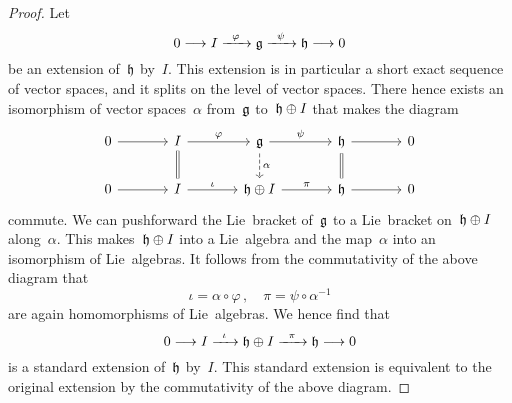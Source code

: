 \begin{proof}
  Let
  \[
    0
    \to
    I
    \xto{\varphi}
    \glie
    \xto{\psi}
    \hlie
    \to
    0
  \]
  be an extension of~$\mathfrak{h}$ by~$I$.
  This extension is in particular a short exact sequence of vector spaces, and it splits on the level of vector spaces.
  There hence exists an isomorphism of vector spaces~$\alpha$ from~$\mathfrak{g}$ to~$\mathfrak{h} \oplus I$ that makes the diagram
  \[
    \begin{tikzcd}[column sep = large]
      0
      \arrow{r}
      &
      I
      \arrow{r}[above]{\varphi}
      \arrow[equal]{d}
      &
      \glie
      \arrow{r}[above]{\psi}
      \arrow[dashed]{d}[right]{\alpha}
      &
      \hlie
      \arrow{r}
      \arrow[equal]{d}
      &
      0
      \\
      0
      \arrow{r}
      &
      I
      \arrow{r}[above]{\iota}
      &
      \hlie \oplus I
      \arrow{r}[above]{\pi}
      &
      \hlie
      \arrow{r}
      &
      0
    \end{tikzcd}
  \]
  commute.
  We can pushforward the Lie~bracket of~$\mathfrak{g}$ to a Lie~bracket on~$\mathfrak{h} \oplus I$ along~$\alpha$.
  This makes~$\mathfrak{h} \oplus I$ into a Lie~algebra and the map~$\alpha$ into an isomorphism of Lie~algebras.
  It follows from the commutativity of the above diagram that
  \[
    \iota = \alpha \circ \varphi \,,
    \quad
    \pi = \psi \circ \alpha^{-1}
  \]
  are again homomorphisms of Lie~algebras.
  We hence find that
  \[
    0
    \to
    I
    \xto{\iota}
    \hlie \oplus I
    \xto{\pi}
    \hlie
    \to
    0
  \]
  is a standard extension of~$\mathfrak{h}$ by~$I$.
  This standard extension is equivalent to the original extension by the commutativity of the above diagram.
\end{proof}


